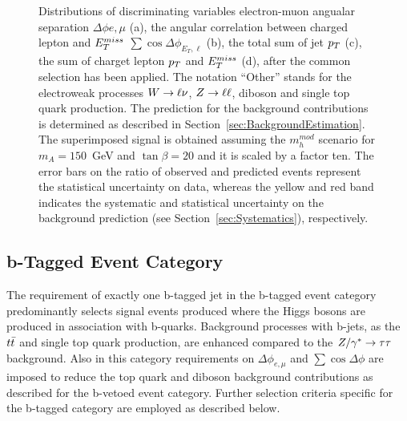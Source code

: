 \begin{figure}[p]
\begin{center}
{            %
	    \label{Ht}	
     }	

    \end{center}
    \caption{Distributions of discriminating variables electron-muon angualar separation
	$\Delta\phi{e,\mu}$ (a), the angular correlation between charged lepton and $E_{T}^{miss}$ $\sum\cos\Delta\phi_{E_{T},\ell}$ (b),
	the total sum of jet $p_{T}$ (c), the sum of charget lepton $p_{T}$ and $E_{T}^{miss}$ (d), after the common selection has been applied.
 	The notation ``Other'' stands 	for the electroweak processes $W\rightarrow \ell \nu$, $Z\rightarrow \ell \ell$, diboson and single top quark production.
	The prediction for the background contributions is determined as described in 	Section~\ref{sec:BackgroundEstimation}.
	The superimposed signal is obtained assuming the $m_h^{mod}$ scenario for $m_A=150$~GeV and $\tan\beta=20$ and it is scaled
	by a factor ten. The error bars on the ratio of observed and predicted events represent the statistical uncertainty on data,
	whereas the yellow and red band indicates the systematic and statistical uncertainty on the background prediction (see Section~\ref{sec:Systematics}),
	respectively.}
   \label{fig:selections}
\end{figure}

\subsection{b-Tagged Event Category}\label{sec:tag}
The requirement of exactly one b-tagged jet in the b-tagged event category predominantly selects signal events produced 
where the Higgs bosons are produced in  association with b-quarks.
Background processes with b-jets, as the $t\bar{t}$ and single top quark production, are enhanced compared to the $Z/\gamma^*\rightarrow \tau\tau$ background.
Also in this category requirements on $\Delta\phi_{e,\mu}$ and $\sum\cos\Delta\phi$  are imposed to reduce the top quark and diboson background contributions
as described for the b-vetoed event category. Further selection criteria specific for the b-tagged category
are employed  as described below.

